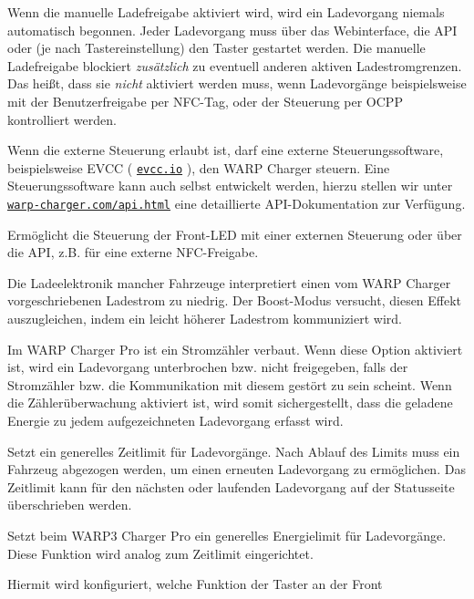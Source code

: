 \documentclass[a4paper,10pt]{article}
\newcommand\rurl[2]{%
  \href{#1}{\nolinkurl{#2}}%
}
\begin{document}
\begin{multicols*}{2}
    \begin{description}[labelindent=0.5cm, leftmargin=0.5cm]
     \item[Manuelle Ladefreigabe] Wenn die manuelle Ladefreigabe aktiviert wird, wird ein Ladevorgang niemals automatisch begonnen. Jeder Ladevorgang muss über das Webinterface, die API oder (je nach Tastereinstellung) den Taster gestartet werden. Die manuelle Ladefreigabe blockiert \textit{zusätzlich} zu eventuell anderen aktiven Ladestromgrenzen. Das heißt, dass sie \textit{nicht} aktiviert werden muss, wenn Ladevorgänge beispielsweise mit der Benutzerfreigabe per NFC-Tag, oder der Steuerung per OCPP kontrolliert werden.
     \item[Externe Steuerung] Wenn die externe Steuerung erlaubt ist, darf eine externe Steuerungssoftware, beispielsweise
     EVCC (\rurl{https://evcc.io}{evcc.io}), den WARP Charger steuern. Eine Steuerungssoftware kann auch selbst entwickelt werden, hierzu stellen
     wir unter \rurl{https://warp-charger.com/api.html}{warp-charger.com/api.html} eine detaillierte API-Dokumentation zur Verfügung.
     \item[Status-LED-Steuerung] Ermöglicht die Steuerung der Front-LED mit einer externen Steuerung oder über die API, z.B. für eine externe NFC-Freigabe.
     \item[Boost-Modus] Die Ladeelektronik mancher Fahrzeuge interpretiert einen vom WARP Charger vorgeschriebenen Ladestrom zu niedrig. Der Boost-Modus versucht, diesen Effekt auszugleichen, indem ein leicht höherer Ladestrom kommuniziert wird.
     \item[Zählerüberwachung] Im WARP Charger Pro ist ein Stromzähler verbaut. Wenn diese Option aktiviert ist, wird ein Ladevorgang unterbrochen bzw. nicht freigegeben, falls der Stromzähler bzw. die Kommunikation mit diesem gestört zu sein scheint. Wenn die Zählerüberwachung aktiviert ist, wird somit sichergestellt, dass die geladene Energie zu jedem aufgezeichneten Ladevorgang erfasst wird.
     \item[Zeitlimit] Setzt ein generelles Zeitlimit für Ladevorgänge. Nach Ablauf des Limits muss ein Fahrzeug abgezogen werden, um einen erneuten Ladevorgang zu ermöglichen. Das Zeitlimit kann für den nächsten oder laufenden Ladevorgang auf der Statusseite überschrieben werden.
     \item[Energielimit] Setzt beim WARP3 Charger Pro ein generelles Energielimit für Ladevorgänge. Diese Funktion wird analog zum Zeitlimit eingerichtet.
     \item[Tastereinstellung] Hiermit wird konfiguriert, welche Funktion der Taster an der Front

\end{description}
\end{multicols*}
\end{document}
